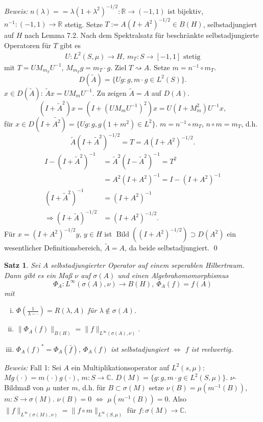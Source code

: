 \documentclass[12pt]{extreport} %
\newtheorem{Satz}{Satz}[subsection]
\DeclareMathOperator{\Bild}{Bild}
\numberwithin{equation}{section}
\newcommand{\C}{\mathbb{C}} %
\newcommand{\R}{\mathbb{R}} %
\newcommand{\m}{\cdot}
\newcommand{\Bew}{\emph{Beweis: }}
\begin{document}
\Bew $n(\lambda) =  = \lambda(1+\lambda^2)^{-1/2}\colon \R\rightarrow (-1,1)$ ist bijektiv, $n^{-1}\colon (-1,1)\rightarrow \R$ stetig. Setze $T:= A(I+A^2)^{-1/2}\in B(H)$, selbstadjungiert auf $H$ nach Lemma 7.2. Nach dem Spektralsatz für beschränkte selbstadjungierte Operatoren für $T$ gibt es 
\begin{align*}
	U\colon L^2(S,\mu)\rightarrow H,~m_T\colon S\rightarrow [-1,1]\text{ stetig}
\end{align*}
mit $T = UM_{m_T}U^{-1}$, $M_{m_T} g = m_T\m g$. Ziel $T\rightsquigarrow A$. Setze $m = n^{-1}\circ m_T$.
$$D(\tilde A) = \{Ug\colon g, m\m g\in L^2(S) \}.$$
$x\in D(\tilde A)$: $\tilde{A}x = U M_m U^{-1}.$ Zu zeigen $\tilde A = A$ auf $D(A)$.
$$(I+\tilde{A}^2)x = (I+(UM_mU^{-1})^2)x = U(I+M_m^2)U^{-1}x,$$
für $x\in D(I+\tilde{A^2}) = \{Ug\colon g,g(1+m^2)\in L^2 \}$. $m = n^{-1}\circ m_T$, $n\circ m = m_T$, d.h. 
$$\tilde{A}(I+\tilde{A}^2)^{-1/2} = T= A(I+A^2)^{-1/2}.$$
\begin{align*}
	I-(I+\tilde{A}^2)^{-1} &= \tilde{A}^2(I-\tilde{A}^2)^{-1} = T^2\\
	&= A^2(I+A^2)^{-1} = I- (I+A^2)^{-1}\\
	(I+\tilde{A}^2)^{-1} &= (I+A^2)^{-1}\\
	\Rightarrow (I+\tilde{A})^{-1/2} &= (I+A^2)^{-1/2}.
\end{align*}
Für $x= (I+A^2)^{-1/2}y$, $y\in H$ ist $\Bild((I+A^2)^{-1/2})\supset D(A^2)$ ein wesentlicher Definitionsbereich, $\tilde{A} = A$, da beide selbstadjungiert.
\qed

	
	\begin{Satz}
		Sei $A$ selbstadjungierter Operator auf einem seperablen Hilbertraum. Dann gibt es ein Maß $\nu$ auf $\sigma(A)$ und einen Algebrahomomorphismus
		$$\Phi_A\colon L^\infty(\sigma(A), \nu)\rightarrow B(H), ~\Phi_A(f) = f(A)$$
		mit
		\begin{enumerate}[(i)]
			\item $\Phi\left(\frac{1}{\lambda-\m} \right)= R(\lambda, A)$ für $\lambda\notin \sigma(A)$.
			\item $\|\Phi_A(f)\|_{B(H)} = \|f\|_{L^\infty(\sigma(A), \nu)}$.
			\item $\Phi_A(f)^* = \Phi_A(\bar f)$, $\Phi_A(f)$ ist selbstadjungiert $\Leftrightarrow$ $f$ ist reelwertig.
		\end{enumerate}
	\end{Satz}
	
	\Bew Fall 1: Sei $A$ ein Multiplikationsoperator auf $L^2(s,\mu)$: $Mg(\m) = m(\m)g(\m)$, $m\colon S\rightarrow \C$. $D(M) = \{g\colon g, m\m g\in L^2(S,\mu) \}$. $\nu$-Bildmaß von $\mu$ unter $m$, d.h. für $B\subset \sigma(M)$ setze $\nu(B) = \mu(m^{-1}(B))$, $m\colon S\rightarrow \sigma(M)$. $\nu(B) = 0$ $\Leftrightarrow$ $\mu(m^{-1}(B)) = 0$. Also $\|f\|_{L^\infty(\sigma(M),\nu)} = \|f\circ m\|_{L^\infty(S,\mu)}$ für $f\colon \sigma(M)\rightarrow \C$.
\end{document}
